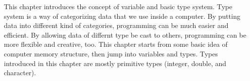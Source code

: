 \documentclass[../main.tex]{subfiles}
\begin{document}
This chapter introduces the concept of variable and basic type system. Type system
is a way of categorizing data that we use inside a computer. By putting data into
different kind of categories, programming can be much easier and efficient. By
allowing data of differnt type be cast to others, programming can be more flexible
and creative, too. This chapter starts from some basic idea of computer memory
structure, then jump into variables and types. Types introduced in this chapter
are mostly primitive types (integer, double, and character).
\end{document}
